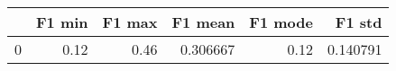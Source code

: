 \begin{tabular}{lrrrrr}
\toprule
{} &  F1 min &  F1 max &   F1 mean &  F1 mode &    F1 std \\
\midrule
0 &    0.12 &    0.46 &  0.306667 &     0.12 &  0.140791 \\
\bottomrule
\end{tabular}
